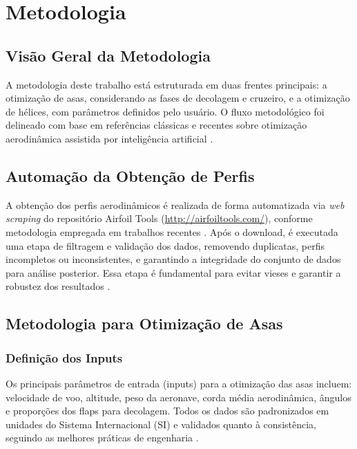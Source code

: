 \chapter{Metodologia}

\section{Visão Geral da Metodologia}
A metodologia deste trabalho está estruturada em duas frentes principais: a otimização de asas, considerando as fases de decolagem e cruzeiro, e a otimização de hélices, com parâmetros definidos pelo usuário. O fluxo metodológico foi delineado com base em referências clássicas e recentes sobre otimização aerodinâmica assistida por inteligência artificial \cite{oliveira2023, hasan2024, wu2024}.

\section{Automação da Obtenção de Perfis}
A obtenção dos perfis aerodinâmicos é realizada de forma automatizada via \textit{web scraping} do repositório Airfoil Tools (\url{http://airfoiltools.com/}), conforme metodologia empregada em trabalhos recentes \cite{oliveira2023}. Após o download, é executada uma etapa de filtragem e validação dos dados, removendo duplicatas, perfis incompletos ou inconsistentes, e garantindo a integridade do conjunto de dados para análise posterior. Essa etapa é fundamental para evitar vieses e garantir a robustez dos resultados \cite{abbott1959theory}.

\section{Metodologia para Otimização de Asas}
\subsection{Definição dos Inputs}
\label{subsec:inputs}
Os principais parâmetros de entrada (inputs) para a otimização das asas incluem: velocidade de voo, altitude, peso da aeronave, corda média aerodinâmica, ângulos e proporções dos flaps para decolagem. Todos os dados são padronizados em unidades do Sistema Internacional (SI) e validados quanto à consistência, seguindo as melhores práticas de engenharia \cite{anderson2017fundamentals, raymer2018aircraft}.

